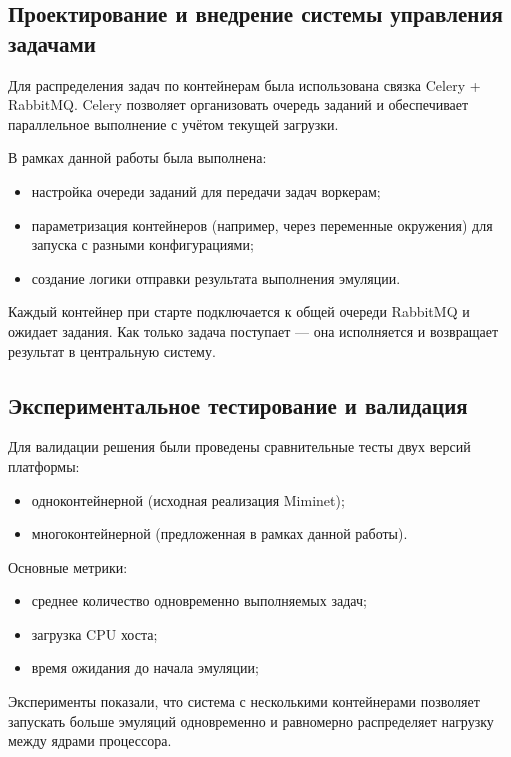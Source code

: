 \subsection{Проектирование и внедрение системы управления задачами}
\label{subsec:task2}

Для распределения задач по контейнерам была использована связка Celery\cite{celery} + RabbitMQ\cite{miminet}.
Celery\cite{celery} позволяет организовать очередь заданий и обеспечивает параллельное выполнение с учётом текущей загрузки.

В рамках данной работы была выполнена:
\begin{itemize}
  \item настройка очереди заданий для передачи задач воркерам;
  \item параметризация контейнеров (например, через переменные окружения) для запуска с разными конфигурациями;
  \item создание логики отправки результата выполнения эмуляции.
\end{itemize}

Каждый контейнер при старте подключается к общей очереди RabbitMQ\cite{rabbitmq} и ожидает задания. Как только задача поступает — она исполняется и возвращает результат в центральную систему.

\subsection{Экспериментальное тестирование и валидация}
\label{subsec:task3}

Для валидации решения были проведены сравнительные тесты двух версий платформы:
\begin{itemize}
  \item одноконтейнерной (исходная реализация Miminet);
  \item многоконтейнерной (предложенная в рамках данной работы).
\end{itemize}

Основные метрики:
\begin{itemize}
  \item среднее количество одновременно выполняемых задач;
  \item загрузка CPU хоста;
  \item время ожидания до начала эмуляции;
\end{itemize}

Эксперименты показали, что система с несколькими контейнерами позволяет запускать больше эмуляций одновременно и равномерно распределяет нагрузку между ядрами процессора.


